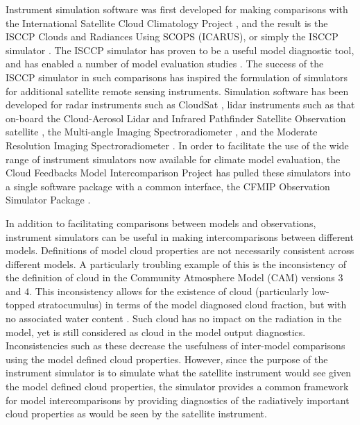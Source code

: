 Instrument simulation software was first developed for making comparisons with the International Satellite Cloud Climatology Project \citep[ISCCP;][]{rossow_and_schiffer_1999}, and the result is the ISCCP Clouds and Radiances Using SCOPS (ICARUS), or simply the ISCCP simulator \citep{klein_and_jakob_1999,webb_et_al_2001}. The ISCCP simulator has proven to be a useful model diagnostic tool, and has enabled a number of model evaluation studies \citep[e.g.,][]{norris_and_weaver_2001,lin_and_zhang_2004,zhang_et_al_2005,schmidt_et_al_2006,cole_et_al_2011}. The success of the ISCCP simulator in such comparisons has inspired the formulation of simulators for additional satellite remote sensing instruments. Simulation software has been developed for radar instruments such as CloudSat \citep{haynes_et_al_2007}, lidar instruments such as that on-board the Cloud-Aerosol Lidar and Infrared Pathfinder Satellite Observation satellite \citep[CALIPSO;][]{chepfer_et_al_2008}, the Multi-angle Imaging Spectroradiometer \citep[MISR;][]{marchand_and_ackerman_2010}, and the Moderate Resolution Imaging Spectroradiometer \citep[MODIS;][]{pincus_et_al_2011}. In order to facilitate the use of the wide range of instrument simulators now available for climate model evaluation, the Cloud Feedbacks Model Intercomparison Project \citep[CFMIP;][]{bony_et_al_2011} has pulled these simulators into a single software package with a common interface, the CFMIP Observation Simulator Package \citep[COSP;][]{bodas-salcedo_et_al_2011}.

In addition to facilitating comparisons between models and observations, instrument simulators can be useful in making intercomparisons between different models. Definitions of model cloud properties are not necessarily consistent across different models. A particularly troubling example of this is the inconsistency of the definition of cloud in the Community Atmosphere Model (CAM) versions 3 and 4. This inconsistency allows for the existence of cloud (particularly low-topped stratocumulus) in terms of the model diagnosed cloud fraction, but with no associated water content \citep{hannay_et_al_2009,medeiros_et_al_2011}. Such cloud has no impact on the radiation in the model, yet is still considered as cloud in the model output diagnostics. Inconsistencies such as these decrease the usefulness of inter-model comparisons using the model defined cloud properties. However, since the purpose of the instrument simulator is to simulate what the satellite instrument would see given the model defined cloud properties, the simulator provides a common framework for model intercomparisons by providing diagnostics of the radiatively important cloud properties as would be seen by the satellite instrument.


